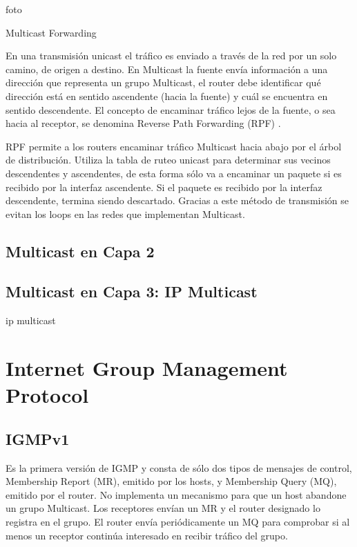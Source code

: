 \documentclass[12pt,a4paper,oneside]{book}
\begin{document}
foto

\vspace{0.5cm}

Multicast Forwarding 

\vspace{0.5cm}

En una transmisión unicast el tráfico es enviado a través de la red por un solo camino, de origen a destino. En Multicast la fuente envía información a una dirección que representa un grupo Multicast, el router debe identificar qué dirección está en sentido ascendente (hacia la fuente) y cuál se encuentra en sentido descendente. El concepto de encaminar tráfico lejos de la fuente, o sea hacia al receptor, se denomina Reverse Path Forwarding (RPF) .

\vspace{0.5cm}

RPF permite a los routers encaminar tráfico Multicast hacia abajo por el árbol de distribución. Utiliza la tabla de ruteo unicast para determinar sus vecinos descendentes y ascendentes, de esta forma sólo va a encaminar un paquete si es recibido por la interfaz ascendente. Si el paquete es recibido por la interfaz descendente, termina siendo descartado. Gracias a este método de transmisión se evitan los loops en las redes que implementan Multicast.



\subsection{Multicast en Capa 2}
\label{mcast_l2}


\subsection{Multicast en Capa 3: IP Multicast}
\label{mcast_l3}
ip multicast


\section{Internet Group Management Protocol}

\subsection{IGMPv1}
\label{igmpv1}

Es la primera versión de IGMP y consta de sólo dos tipos de mensajes de control, Membership Report (MR), emitido por los hosts, y Membership Query (MQ), emitido por el router. No implementa un mecanismo para que un host abandone un grupo Multicast. Los receptores envían un MR y el router designado lo registra en el grupo. El router envía periódicamente un MQ para comprobar si al menos un receptor continúa interesado en recibir tráfico del grupo. 
\end{document}
